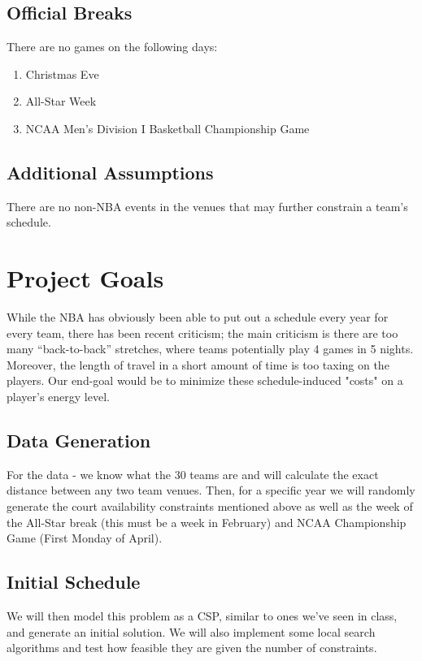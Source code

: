 \documentclass{article}
\begin{document}
	\subsection{Official Breaks}

	There are no games on the following days:

	\begin{enumerate}
		\item Christmas Eve
		\item All-Star Week
		\item NCAA Men's Division I Basketball Championship Game
	\end{enumerate}

    \subsection{Additional Assumptions}
    
    There are no non-NBA events in the venues that may further constrain a team's schedule.
	
	\section{Project Goals}

	While the NBA has obviously been able to put out a schedule every year for every team, there has been recent criticism; the main criticism is there are too many ``back-to-back'' stretches, where teams potentially play 4 games in 5 nights.  Moreover, the length of travel in a short amount of time is too taxing on the players. Our end-goal would be to minimize these schedule-induced "costs" on a player's energy level.
	
	\subsection{Data Generation}
	For the data - we know what the 30 teams are and will calculate the exact distance between any two team venues. Then, for a specific year we will randomly generate the court availability constraints mentioned above as well as the week of the All-Star break (this must be a week in February) and NCAA Championship Game (First Monday of April).

	\subsection{Initial Schedule}
	We will then model this problem as a CSP, similar to ones we've seen in class, and generate an initial solution. We will also implement some local search algorithms and test how feasible they are given the number of constraints. 
\end{document}

